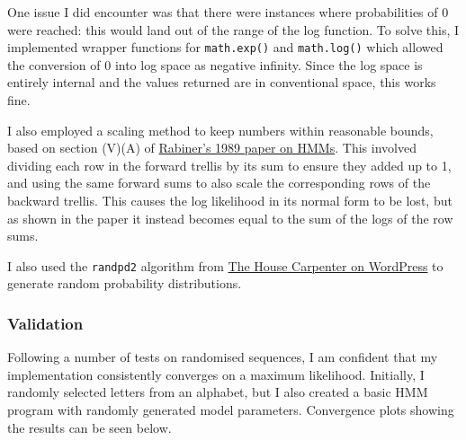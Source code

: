 \documentclass[11pt]{article} %
\begin{document}
One issue I did encounter was that there were instances where probabilities of 0 were reached: this would land out of the range of the log function. To solve this, I implemented wrapper functions for \texttt{math.exp()} and \texttt{math.log()} which allowed the conversion of 0 into log space as negative infinity. Since the log space is entirely internal and the values returned are in conventional space, this works fine.

I also employed a scaling method to keep numbers within reasonable bounds, based on section (V)(A) of \href{http://dx.doi.org/10.1109/5.18626}{Rabiner's 1989 paper on HMMs}. This involved dividing each row in the forward trellis by its sum to ensure they added up to 1, and using the same forward sums to also scale the corresponding rows of the backward trellis. This causes the log likelihood in its normal form to be lost, but as shown in the paper it instead becomes equal to the sum of the logs of the row sums.

I also used the \texttt{randpd2} algorithm from \href{https://thehousecarpenter.wordpress.com/2017/02/22/generating-random-probability-distributions/}{The House Carpenter on WordPress} to generate random probability distributions.


\subsubsection{Validation}

Following a number of tests on randomised sequences, I am confident that my implementation consistently converges on a maximum likelihood. Initially, I randomly selected letters from an alphabet, but I also created a basic HMM program with randomly generated model parameters. Convergence plots showing the results can be seen below.
\end{document}
